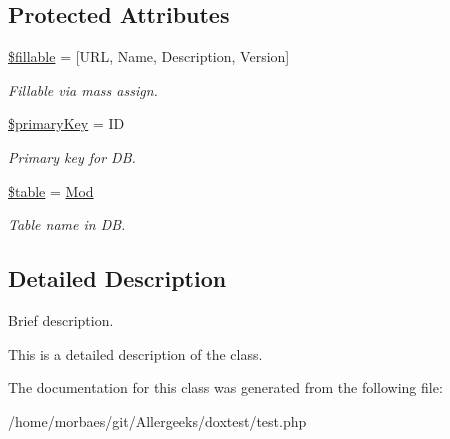 \subsection*{Protected Attributes}
\begin{DoxyCompactItemize}
\item 
\hypertarget{class_mod_a6a90e74ccdf5efd70d51d10c906f8e32}{}\hyperlink{class_mod_a6a90e74ccdf5efd70d51d10c906f8e32}{\$fillable} = \mbox{[}\textquotesingle{}U\+R\+L\textquotesingle{}, \textquotesingle{}Name\textquotesingle{}, \textquotesingle{}Description\textquotesingle{}, \textquotesingle{}Version\textquotesingle{}\mbox{]}\label{class_mod_a6a90e74ccdf5efd70d51d10c906f8e32}

\begin{DoxyCompactList}\small\item\em Fillable via mass assign. \end{DoxyCompactList}\item 
\hypertarget{class_mod_a927b0256b942a3ee89485f2649af7981}{}\hyperlink{class_mod_a927b0256b942a3ee89485f2649af7981}{\$primary\+Key} = \textquotesingle{}I\+D\textquotesingle{}\label{class_mod_a927b0256b942a3ee89485f2649af7981}

\begin{DoxyCompactList}\small\item\em Primary key for D\+B. \end{DoxyCompactList}\item 
\hypertarget{class_mod_ae8876a14058f368335baccf35af4a22b}{}\hyperlink{class_mod_ae8876a14058f368335baccf35af4a22b}{\$table} = \textquotesingle{}\hyperlink{class_mod}{Mod}\textquotesingle{}\label{class_mod_ae8876a14058f368335baccf35af4a22b}

\begin{DoxyCompactList}\small\item\em Table name in D\+B. \end{DoxyCompactList}\end{DoxyCompactItemize}


\subsection{Detailed Description}
Brief description. 

This is a detailed description of the class. 

The documentation for this class was generated from the following file\+:\begin{DoxyCompactItemize}
\item 
/home/morbaes/git/\+Allergeeks/doxtest/test.\+php\end{DoxyCompactItemize}
